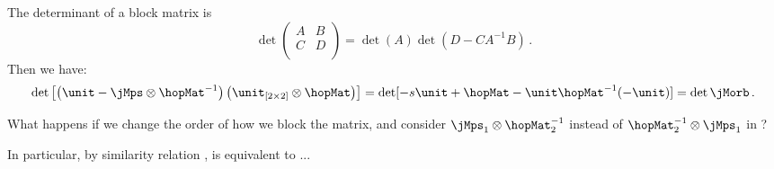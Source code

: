 The determinant of a block matrix is
\[
\det
\left(
\begin{array}{cc}
A & B \\
C & D \\
\end{array}
\right)
=
\det(A)\det(D-CA^{-1}B)
\, .
\]
Then we have:
\[
\det \left[\left( \unit-\jMps \otimes \hopMat^{-1} \right) \left( \unit_{[2\times 2]} \otimes \hopMat \right)\right]
=
\det [-s \unit + \hopMat - \unit \hopMat^{-1} (-\unit)]
=
\det \jMorb
\,.
\]


What happens if we change the order of how we block the matrix, and
consider ${\mathbf{\jMps}_1} \otimes \hopMat_2^{-1}$ instead of
$\hopMat_2^{-1}\otimes{\mathbf{\jMps}_1}$ in ?

In particular, by similarity relation ,
 is equivalent to ...

